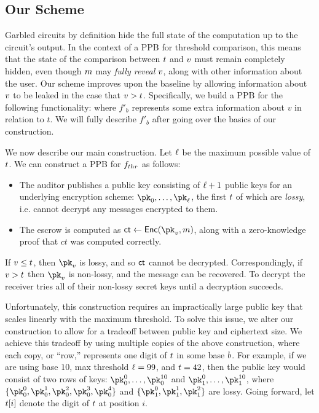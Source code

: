 \subsection{Our Scheme}
Garbled circuits by definition hide the full state of the computation up to the circuit's output.
In the context of a PPB for threshold comparison, this means that the state of the comparison between $t$ and $v$ must remain completely hidden, even though $m$ may \emph{fully reveal} $v$, along with other information about the user.
Our scheme improves upon the baseline by allowing information about $v$ to be leaked in the case that $v > t$.
Specifically, we build a PPB for the following functionality:
\fthrleak
where $f'_{b}$ represents some extra information about $v$ in relation to $t$.
We will fully describe $f'_b$ after going over the basics of our construction.

We  now describe our main construction.
Let $\ell$ be the maximum possible value of $t$.
We can construct a PPB for $f_{thr}$ as follows:
\begin{itemize}
	\item The auditor publishes a public key consisting of $\ell + 1$ public keys for an underlying encryption scheme: $\pk_0,\dots,\pk_{\maxt}$, the first $t$ of which are \textit{lossy}, i.e. cannot decrypt any messages encrypted to them.
	\item The escrow is computed as $\ct \gets {\sf Enc}({\pk_{\uval}}, \msg)$, along with a zero-knowledge proof that $ct$ was computed correctly.
\end{itemize}
If $v \leq t$, then $\pk_{\uval}$ is lossy, and so $\mathsf{ct}$ cannot be decrypted.
Correspondingly, if $v > t$ then $\pk_{\uval}$ is non-lossy, and the message can be recovered. To decrypt the receiver tries all of their non-lossy secret keys until a decryption succeeds.

Unfortunately, this construction requires an impractically large public key that scales linearly with the maximum threshold.
To solve this issue, we alter our construction to allow for a tradeoff between public key and ciphertext size.
We achieve this tradeoff by using multiple copies of the above construction, where each copy, or ``row,'' represents one digit of $t$ in some base $b$.
For example, if we are using base $10$, max threshold $\ell = 99$, and $t = 42$, then the public key would consist of two rows of keys: $\pk^0_0,\dots,\pk^{10}_{0}$ and $\pk^0_1,\dots,\pk^{10}_{1}$, where $\{\pk^0_0, \pk^1_0, \pk^2_0, \pk^3_0, \pk^4_0\}$ and $\{\pk^0_1, \pk^1_1, \pk^2_1\}$ are lossy. Going forward, let $t[i]$ denote the digit of $t$ at position $i$.


